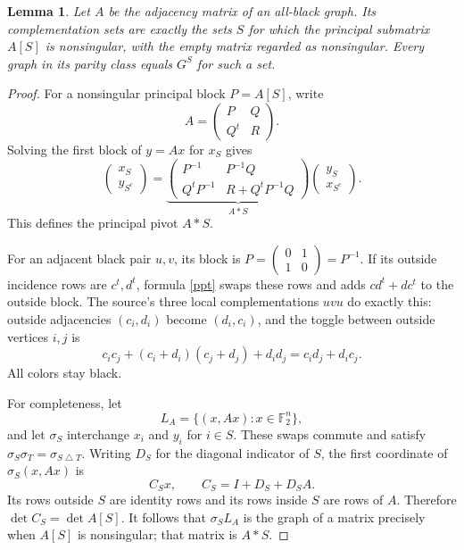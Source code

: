 \documentclass[11pt]{article}
\newtheorem{lemma}{Lemma}
\newcommand{\F}{\mathbb F_2}
\begin{document}
\begin{lemma}\label{pivots}
Let \(A\) be the adjacency matrix of an all-black graph.
Its complementation sets are exactly the sets \(S\) for which the
principal submatrix \(A[S]\) is nonsingular, with the empty matrix
regarded as nonsingular. Every graph in its parity class equals
\(G^S\) for such a set.
\end{lemma}
\begin{proof}
For a nonsingular principal block \(P=A[S]\), write
\[
 A=\begin{pmatrix}P&Q\\Q^t&R\end{pmatrix}.
\]
Solving the first block of \(y=Ax\) for \(x_S\) gives
\begin{equation}\label{ppt}
 \begin{pmatrix}x_S\\y_{S^c}\end{pmatrix}
 =
 \underbrace{\begin{pmatrix}
 P^{-1}&P^{-1}Q\\Q^tP^{-1}&R+Q^tP^{-1}Q
 \end{pmatrix}}_{A*S}
 \begin{pmatrix}y_S\\x_{S^c}\end{pmatrix}.
\end{equation}
This defines the principal pivot \(A*S\).

For an adjacent black pair \(u,v\), its block is
\(P=\left(\begin{smallmatrix}0&1\\1&0\end{smallmatrix}\right)=P^{-1}\).
If its outside incidence rows are \(c^t,d^t\), formula \eqref{ppt}
swaps these rows and adds \(cd^t+dc^t\) to the outside block.
The source's three local complementations \(uvu\) do exactly this:
outside adjacencies \((c_i,d_i)\) become \((d_i,c_i)\), and the
toggle between outside vertices \(i,j\) is
\[
 c_ic_j+(c_i+d_i)(c_j+d_j)+d_id_j=c_id_j+d_ic_j.
\]
All colors stay black.

For completeness, let
\[
 L_A=\{(x,Ax):x\in\F^n\},
\]
and let \(\sigma_S\) interchange \(x_i\) and \(y_i\) for \(i\in S\).
These swaps commute and satisfy
\(\sigma_S\sigma_T=\sigma_{S\mathbin{\triangle}T}\).
Writing \(D_S\) for the diagonal indicator of \(S\), the first
coordinate of \(\sigma_S(x,Ax)\) is
\[
 C_Sx,\qquad C_S=I+D_S+D_SA.
\]
Its rows outside \(S\) are identity rows and its rows inside \(S\)
are rows of \(A\). Therefore
\(\det C_S=\det A[S]\).
It follows that \(\sigma_SL_A\) is the graph of a matrix precisely
when \(A[S]\) is nonsingular; that matrix is \(A*S\).


\end{proof}
\end{document}
